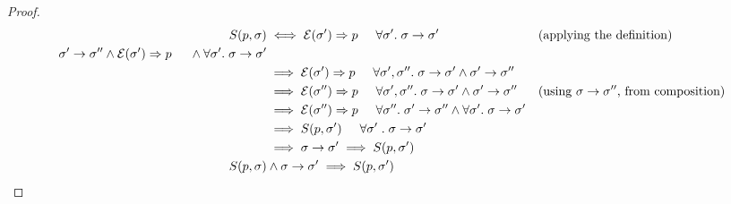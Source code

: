 \documentclass{article}
\theoremstyle{definition}
\begin{document}
\begin{proof}
  \begin{align*}
    S(p,\sigma) &\iff \mathcal{E}(\sigma') \Rightarrow p \hspace{5mm} \forall{\sigma'}. \hspace{1mm} \sigma \to \sigma' &&\text{(applying the definition)} \\
    \sigma' \to \sigma'' \land \mathcal{E}(\sigma') \Rightarrow p \hspace{5mm}  \land \forall{\sigma'}. \hspace{1mm} \sigma \to \sigma' \\
    &\implies \mathcal{E}(\sigma') \Rightarrow p \hspace{5mm} \forall{\sigma', \sigma''}. \hspace{1mm} \sigma \to \sigma' \land \sigma' \to \sigma''  \\
    &\implies \mathcal{E}(\sigma'') \Rightarrow p \hspace{5mm} \forall{\sigma', \sigma''}. \hspace{1mm} \sigma \to \sigma' \land \sigma' \to \sigma'' &&\text{(using $\sigma \to \sigma''$, from composition)} \\
    &\implies \mathcal{E}(\sigma'') \Rightarrow p \hspace{5mm} \forall{\sigma''}. \hspace{1mm} \sigma' \to \sigma'' \land \forall{\sigma'}. \hspace{1mm} \sigma \to \sigma'  \\
    &\implies S(p, \sigma') \hspace{5mm} \forall{\sigma'} \hspace{1mm} . \hspace{1mm} \sigma \to \sigma'\\
    &\implies \sigma \to \sigma' \implies S(p, \sigma') \\
    S(p,\sigma) &\land \sigma \to \sigma' \implies S(p, \sigma') &&\qedhere
  \end{align*}
\end{proof}
\end{document}
